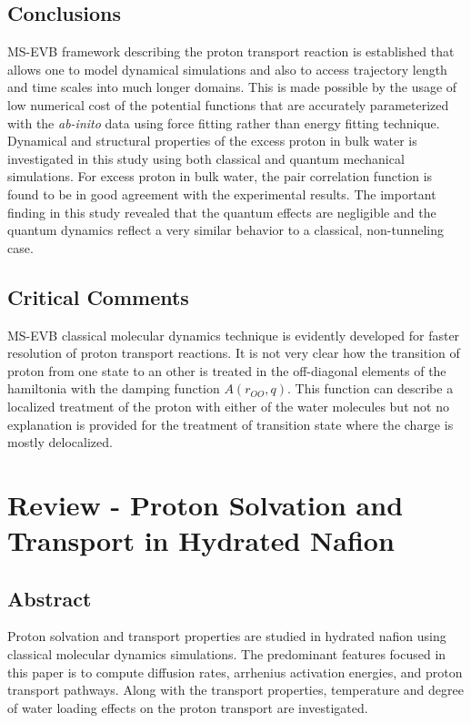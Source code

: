 \documentclass{article}
\begin{document}
\subsection{Conclusions}
\label{sec-2-4}
MS-EVB framework describing the proton transport reaction is established that allows one to model dynamical simulations and also to access trajectory length and time scales into much longer domains. This is made possible by the usage of low numerical cost of the potential functions that are accurately parameterized with the \emph{ab-inito} data using force fitting rather than energy fitting technique. Dynamical and structural properties of the excess proton in bulk water is investigated in this study using both classical and quantum mechanical simulations. For excess proton in bulk water, the pair correlation function is found to be in good agreement with the experimental results. The important finding in this study revealed that the quantum effects are negligible and the quantum dynamics reflect a very similar behavior to a classical, non-tunneling case.

\subsection{Critical Comments}
\label{sec-2-5}
MS-EVB classical molecular dynamics technique is evidently developed for faster resolution of proton transport reactions. It is not very clear how the transition of proton from one state to an other is treated in the off-diagonal elements of the hamiltonia with the damping function $A(r_{OO},q)$. This function can describe a localized treatment of the proton with either of the water molecules but not no explanation is provided for the treatment of transition state where the charge is mostly delocalized.

\section{Review - Proton Solvation and Transport in Hydrated Nafion \cite{voth2011}}
\label{sec-3}
\subsection{Abstract}
\label{sec-3-1}
Proton solvation and transport properties are studied in hydrated nafion using classical molecular dynamics simulations. The predominant features focused in this paper is to compute diffusion rates, arrhenius activation energies, and proton transport pathways. Along with the transport properties, temperature and degree of water loading effects on the proton transport are investigated. 
\end{document}
